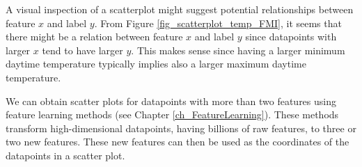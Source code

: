 \documentclass[12pt]{report}
\begin{document}
A visual inspection of a scatterplot might suggest potential 
relationships between feature $x$ and label $y$. From Figure 
\ref{fig_scatterplot_temp_FMI}, it seems that there might be 
a relation between feature $x$ and label $y$ since datapoints 
with larger $x$ tend to have larger $y$. This makes sense since 
having a larger minimum daytime temperature typically implies 
also a larger maximum daytime temperature. 

We can obtain scatter plots for datapoints with more than two 
features using feature learning methods (see Chapter \ref{ch_FeatureLearning}). 
These methods transform high-dimensional datapoints, 
having billions of raw features, to three or two new features. 
These new features can then be used as the coordinates of 
the datapoints in a scatter plot.


\end{document}
